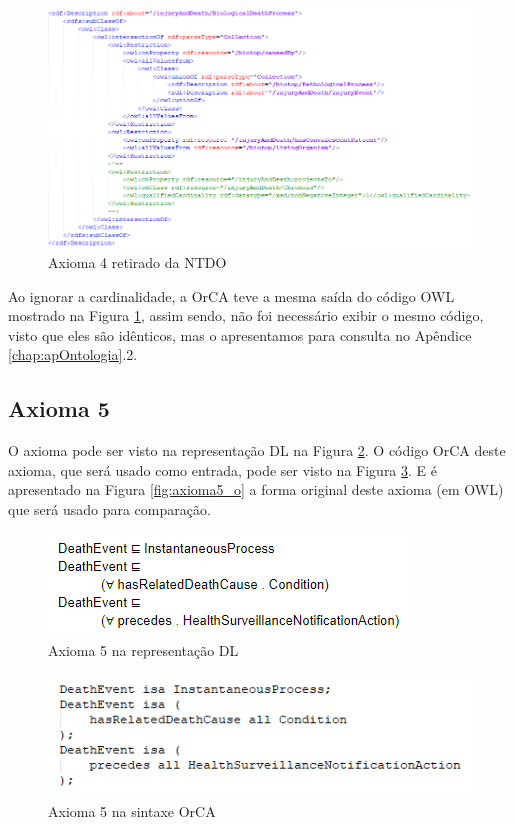 \documentclass{bcc}
\begin{document}
\begin{figure}[H]
\centering
\includegraphics[width=1\textwidth]{Figuras/axioma4_o.png}
\caption{Axioma 4 retirado da NTDO} 
\label{fig:axioma4_o}
\end{figure}

Ao ignorar a cardinalidade, a OrCA teve a mesma saída do código OWL mostrado na Figura \ref{fig:axioma4_o}, assim sendo, não foi necessário exibir o mesmo código, visto que eles são idênticos, mas o apresentamos para consulta no Apêndice \ref{chap:apOntologia}.2.

\subsection{Axioma 5}
O axioma pode ser visto na representação DL na Figura \ref{fig:axioma5_dl}. O código OrCA deste axioma, que será usado como entrada, pode ser visto na Figura \ref{fig:axioma5_orca}. E é apresentado na Figura \ref{fig:axioma5_o} a forma original deste axioma (em OWL) que será usado para comparação. 

\begin{figure}[H]
\centering
\includegraphics[width=.6\textwidth]{Figuras/axioma5_dl.png}
\caption{Axioma 5 na representação DL} 
\label{fig:axioma5_dl}
\end{figure}

\begin{figure}[H]
\centering
\includegraphics[width=.7\textwidth]{Figuras/axioma5_orca.png}
\caption{Axioma 5 na sintaxe OrCA} 
\label{fig:axioma5_orca}
\end{figure}
\end{document}
